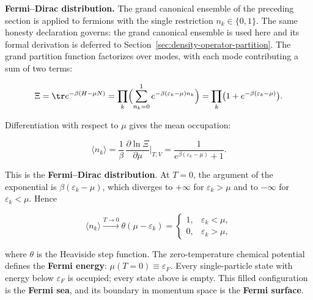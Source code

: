 \medskip\noindent\textbf{Fermi--Dirac distribution.}
The grand canonical ensemble of the preceding section is applied to fermions with the single restriction $n_k \in \{0, 1\}$. The same honesty declaration governs: the grand canonical ensemble is used here and its formal derivation is deferred to Section~\ref{sec:density-operator-partition}. The grand partition function factorizes over modes, with each mode contributing a sum of two terms:
\begin{linenomath}
    \begin{equation}
        \Xi = \tr e^{-\beta(H - \mu N)}
            = \prod_k \Bigl(\sum_{n_k=0}^{1} e^{-\beta(\varepsilon_k - \mu)n_k}\Bigr)
            = \prod_k \bigl(1 + e^{-\beta(\varepsilon_k - \mu)}\bigr).
        \label{eq:grand-partition-fermions}
    \end{equation}
\end{linenomath}
Differentiation with respect to $\mu$ gives the mean occupation:
\begin{linenomath}
    \begin{equation}
        \langle n_k \rangle
        = \frac{1}{\beta}\,\frac{\partial\ln\Xi}{\partial\mu}\bigg|_{T,V}
        = \frac{1}{e^{\beta(\varepsilon_k - \mu)} + 1}.
        \label{eq:fd-distribution}
    \end{equation}
\end{linenomath}
This is the \textbf{Fermi--Dirac distribution}. At $T = 0$, the argument of the exponential is $\beta(\varepsilon_k - \mu)$, which diverges to $+\infty$ for $\varepsilon_k > \mu$ and to $-\infty$ for $\varepsilon_k < \mu$. Hence
\begin{linenomath}
    \begin{equation*}
        \langle n_k \rangle \xrightarrow{T \to 0}
        \theta(\mu - \varepsilon_k)
        = \begin{cases}
            1, & \varepsilon_k < \mu, \\
            0, & \varepsilon_k > \mu,
        \end{cases}
    \end{equation*}
\end{linenomath}
where $\theta$ is the Heaviside step function. The zero-temperature chemical potential defines the \textbf{Fermi energy}: $\mu(T=0) \equiv \varepsilon_F$. Every single-particle state with energy below $\varepsilon_F$ is occupied; every state above is empty. This filled configuration is the \textbf{Fermi sea}, and its boundary in momentum space is the \textbf{Fermi surface}.

